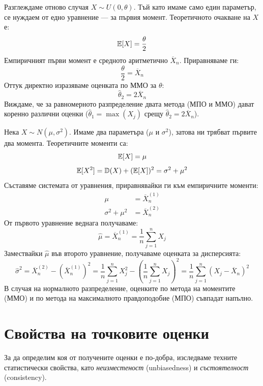 \begin{example}\label{ex:12-3}

Разглеждаме отново случая $X \sim U(0, \theta)$. Тъй като имаме само един параметър, се нуждаем от едно уравнение — за първия момент.
Теоретичното очакване на $X$ е:
\[
    \mathbb{E}[X] = \frac{\theta}{2}
\]
Емпиричният първи момент е средното аритметично $\overline{X}_n$. Приравняваме ги:
\[
    \frac{\theta}{2} = \overline{X}_n
\]
Оттук директно изразяваме оценката по ММО за $\theta$:
\[
    \hat{\theta}_2 = 2 \overline{X}_n
\]
Виждаме, че за равномерното разпределение двата метода (МПО и ММО) дават коренно различни оценки ($\hat{\theta}_1 = \max(X_j)$ срещу $\hat{\theta}_2 = 2\overline{X}_n$).

\end{example}

\begin{example}\label{ex:12-4}

Нека $X \sim N(\mu, \sigma^2)$. Имаме два параметъра ($\mu$ и $\sigma^2$), затова ни трябват първите два момента.
Теоретичните моменти са:
\[
    \mathbb{E}[X] = \mu
\]
\[
    \mathbb{E}[X^2] = \mathbb{D}(X) + (\mathbb{E}[X])^2 = \sigma^2 + \mu^2
\]
Съставяме системата от уравнения, приравнявайки ги към емпиричните моменти:
\begin{align*}
    \mu &= \overline{X}_n^{(1)} \\
    \sigma^2 + \mu^2 &= \overline{X}_n^{(2)}
\end{align*}
От първото уравнение веднага получаваме:
\[
    \hat{\mu} = \overline{X}_n^{(1)} = \frac{1}{n} \sum_{j=1}^n X_j
\]
Замествайки $\hat{\mu}$ във второто уравнение, получаваме оценката за дисперсията:
\[
    \hat{\sigma}^2 = \overline{X}_n^{(2)} - \left(\overline{X}_n^{(1)}\right)^2 = \frac{1}{n} \sum_{j=1}^n X_j^2 - \left(\frac{1}{n} \sum_{j=1}^n X_j\right)^2 = \frac{1}{n} \sum_{j=1}^n \left(X_j - \overline{X}_n\right)^2
\]
В случая на нормалното разпределение, оценките по метода на моментите (ММО) и по метода на максималното правдоподобие (МПО) съвпадат напълно.

\end{example}

\section{Свойства на точковите оценки}

За да определим коя от получените оценки е по-добра, изследваме техните статистически свойства, като \emph{неизместеност} (unbiasedness) и \emph{състоятелност} (consistency).

